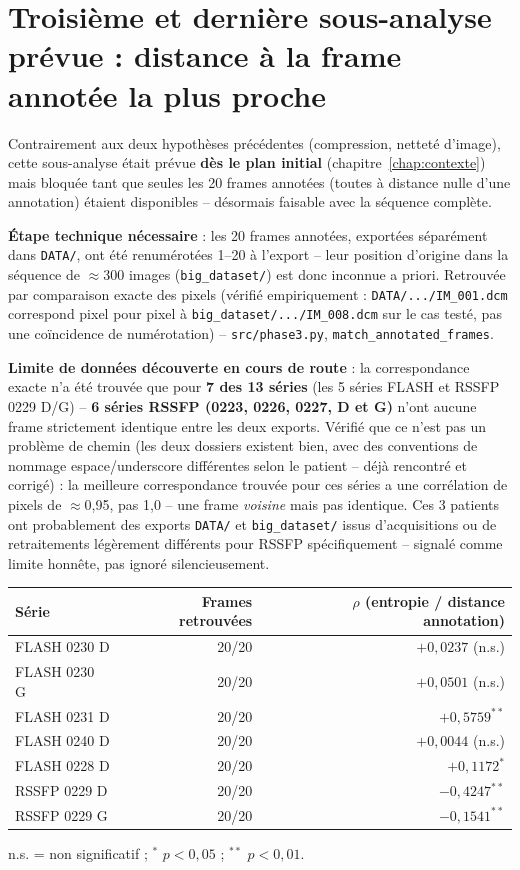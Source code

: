 \documentclass[11pt,a4paper]{report}
\begin{document}
\section{Troisième et dernière sous-analyse prévue : distance à la frame annotée
la plus proche}
\label{sec:phase3-distance-annotation}

Contrairement aux deux hypothèses précédentes (compression, netteté d'image), cette
sous-analyse était prévue \textbf{dès le plan initial} (chapitre~\ref{chap:contexte})
mais bloquée tant que seules les 20 frames annotées (toutes à distance nulle d'une
annotation) étaient disponibles -- désormais faisable avec la séquence complète.

\textbf{Étape technique nécessaire} : les 20 frames annotées, exportées séparément
dans \texttt{DATA/}, ont été renumérotées 1--20 à l'export -- leur position
d'origine dans la séquence de $\approx$300 images (\texttt{big\_dataset/}) est donc
inconnue a priori. Retrouvée par comparaison exacte des pixels (vérifié
empiriquement : \texttt{DATA/.../IM\_001.dcm} correspond pixel pour pixel à
\texttt{big\_dataset/.../IM\_008.dcm} sur le cas testé, pas une coïncidence de
numérotation) -- \texttt{src/phase3.py}, \texttt{match\_annotated\_frames}.

\textbf{Limite de données découverte en cours de route} : la correspondance exacte
n'a été trouvée que pour \textbf{7 des 13 séries} (les 5 séries FLASH et RSSFP
0229 D/G) -- \textbf{6 séries RSSFP (0223, 0226, 0227, D et G)} n'ont aucune frame
strictement identique entre les deux exports. Vérifié que ce n'est pas un problème
de chemin (les deux dossiers existent bien, avec des conventions de nommage
espace/underscore différentes selon le patient -- déjà rencontré et corrigé) : la
meilleure correspondance trouvée pour ces séries a une corrélation de pixels de
$\approx$0,95, pas 1,0 -- une frame \emph{voisine} mais pas identique. Ces 3
patients ont probablement des exports \texttt{DATA/} et \texttt{big\_dataset/}
issus d'acquisitions ou de retraitements légèrement différents pour RSSFP
spécifiquement -- signalé comme limite honnête, pas ignoré silencieusement.

\begin{center}
\begin{tabular}{lrr}
\toprule
Série & Frames retrouvées & $\rho$ (entropie / distance annotation) \\
\midrule
FLASH 0230 D & 20/20 & $+0{,}0237$ (n.s.) \\
FLASH 0230 G & 20/20 & $+0{,}0501$ (n.s.) \\
FLASH 0231 D & 20/20 & $+0{,}5759^{**}$ \\
FLASH 0240 D & 20/20 & $+0{,}0044$ (n.s.) \\
FLASH 0228 D & 20/20 & $+0{,}1172^{*}$ \\
RSSFP 0229 D & 20/20 & $-0{,}4247^{**}$ \\
RSSFP 0229 G & 20/20 & $-0{,}1541^{**}$ \\
\bottomrule
\end{tabular}
\end{center}
{\footnotesize n.s. = non significatif ; $^{*}$ $p<0{,}05$ ; $^{**}$ $p<0{,}01$.}
\end{document}
